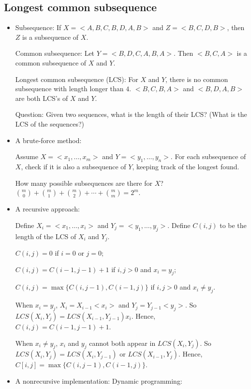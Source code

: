 \documentclass{article}
\begin{document}
\subsection{Longest common subsequence}


\begin{itemize}

\item Subsequence: If $X=<A,B,C,B,D,A,B>$ and $Z=<B,C,D,B>$, then
$Z$ is a subsequence of $X$.

Common subsequence: Let $Y=<B,D,C,A,B,A>$. Then $<B,C,A>$ is a
common subsequence of $X$ and $Y$. 

Longest common subsequence (LCS): For $X$ and $Y$, there is no 
common subsequence with length longer than $4$. $<B,C,B,A>$ and
$<B,D,A,B>$ are both LCS's of $X$ and $Y$.

Question: Given two sequences, what is the length of their LCS?
(What is the LCS of the sequences?)

\item A brute-force method:

Assume $X=<x_1,\ldots,x_m>$ and $Y=<y_1,\ldots,y_n>$. For each subsequence
of $X$, check if it is also a subsequence of $Y$, keeping track of the
longest found.

How many possible subsequences are there for $X$?
${m \choose 0}+{m \choose 1}+{m \choose 2}+\cdots+{m \choose m}
=2^m$.

\item A recursive approach:

Define $X_i=<x_1,\ldots,x_i>$ and $Y_j=<y_1,\ldots,y_j>$.
Define $C(i,j)$ to be the length of the LCS of $X_i$ and $Y_j$.

$C(i,j)=0$ if $i=0$ or $j=0$;

$C(i,j)=C(i-1,j-1)+1$ if $i,j>0$ and $x_i=y_j$;

$C(i,j)=\max\{C(i,j-1),C(i-1,j)\}$ if $i,j>0$ and $x_i\not=y_j$.

When $x_i=y_j$, $X_i=X_{i-1}<x_i>$ and $Y_j=Y_{j-1}<y_j>$.
So $LCS(X_i,Y_j)=LCS(X_{i-1},Y_{j-1})x_i$. Hence,
$C(i,j)=C(i-1,j-1)+1$.

When $x_i\not=y_j$, $x_i$ and $y_j$ cannot both appear in
$LCS(X_i,Y_j)$. So $LCS(X_i,Y_j)=LCS(X_i,Y_{j-1})$ or
$LCS(X_{i-1},Y_j)$. Hence, $C[i,j]=\max\{C(i,j-1),C(i-1,j)\}$.

\item A nonrecursive implementation: Dynamic programming:


\end{itemize}
\end{document}
